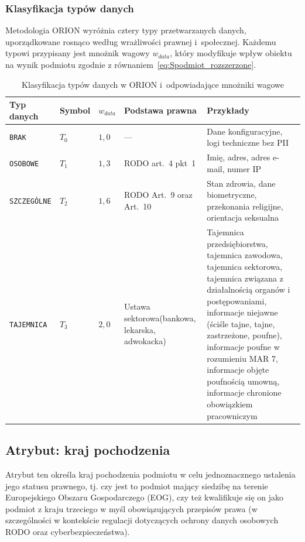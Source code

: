 \subsubsection{Klasyfikacja typów danych}

Metodologia ORION wyróżnia cztery typy przetwarzanych danych, uporządkowane  rosnąco według wrażliwości prawnej i~społecznej. Każdemu typowi  przypisany jest mnożnik wagowy $w_{data}$, który modyfikuje 
wpływ obiektu na wynik podmiotu zgodnie 
z równaniem~\eqref{eq:Spodmiot_rozszerzone}.

\begin{table}[H]
\centering
\caption{Klasyfikacja typów danych w ORION i~odpowiadające mnożniki wagowe}
\label{tab:typy-danych}
\renewcommand{\arraystretch}{1.4}
\begin{tabular}{p{2.5cm}p{1.5cm}p{1.5cm}p{3.5cm}p{4.5cm}}
\toprule
\textbf{Typ danych} & \textbf{Symbol} & \textbf{$w_{data}$} 
& \textbf{Podstawa prawna} & \textbf{Przykłady} \\
\midrule
\texttt{BRAK} & $T_0$ & $1{,}0$ 
& --- 
& Dane konfiguracyjne, logi techniczne bez PII \\
\midrule
\texttt{OSOBOWE} & $T_1$ & $1{,}3$ 
& RODO art.~4 pkt~1 
& Imię, adres, adres e-mail, numer IP \\
\midrule
\texttt{SZCZEGÓLNE} & $T_2$ & $1{,}6$ 
& RODO Art.~9 oraz Art.~10
& Stan zdrowia, dane biometryczne, 
  przekonania religijne, orientacja seksualna \\
\midrule
\texttt{TAJEMNICA} & $T_3$ & $2{,}0$ 
& Ustawa sektorowa\newline(bankowa, lekarska, adwokacka) 
& Tajemnica przedsiębiorstwa, tajemnica zawodowa, tajemnica sektorowa, tajemnica związana z działalnością organów i postępowaniami, informacje niejawne (ściśle tajne, tajne, zastrzeżone, poufne), informacje poufne w rozumieniu MAR 7, informacje objęte poufnością umowną, informacje chronione obowiązkiem pracowniczym \\
\bottomrule
\end{tabular}
\end{table}

\subsection{Atrybut: kraj pochodzenia}
\label{sec:kraj-pochodzenia}
Atrybut ten określa kraj pochodzenia podmiotu w celu jednoznacznego ustalenia jego statusu prawnego, tj. czy jest to podmiot mający siedzibę na terenie Europejskiego Obszaru Gospodarczego (EOG), czy też kwalifikuje się on jako podmiot z kraju trzeciego w myśl obowiązujących przepisów prawa (w szczególności w kontekście regulacji dotyczących ochrony danych osobowych RODO oraz cyberbezpieczeństwa).

